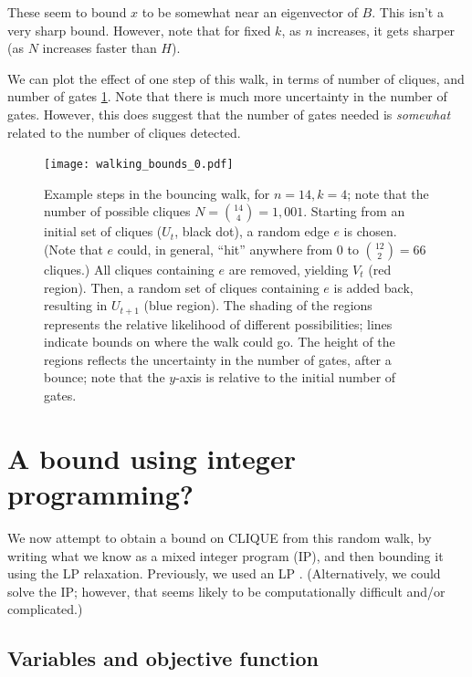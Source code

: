 \documentclass[12pt]{article}
\theoremstyle{definition}
\begin{document}
These seem to bound $x$ to be somewhat near an eigenvector of $B$. This isn't a very sharp bound.
However, note that for fixed $k$, as $n$ increases, it gets sharper (as $N$ increases faster than $H$).

We can plot the effect of one step of this walk, in terms of number of cliques, and number of gates \ref{fig:walk}.
Note that there is much more uncertainty in the number of gates. However, this does suggest that the
number of gates needed is {\em somewhat} related to the number of cliques detected.

\begin{figure}

\centering

\texttt{[image: walking\_bounds\_0.pdf]}

\caption{
Example steps in the bouncing walk, for $n=14, k=4$; 
note that the number of possible cliques $N = {14 \choose 4} = 1,001$.
 Starting from an initial set of cliques ($U_t$, black dot),
a random edge $e$ is chosen. (Note that $e$ could, in general,
``hit'' anywhere from 0 to ${12 \choose 2} = 66$ cliques.)
 All cliques containing $e$ are removed, yielding $V_t$ (red region).
Then, a random set of cliques containing $e$ is added back, resulting in $U_{t+1}$ (blue region).
The shading of the regions represents the relative likelihood of different possibilities;
lines indicate bounds on where the walk could go.
The height of the regions reflects the uncertainty in the number
of gates, after a bounce; note that the $y$-axis is relative to the initial number of gates.
}
\label{fig:walk}

\end{figure}


\section{A bound using integer programming?}

We now attempt to obtain a bound on CLIQUE from this random walk, by
writing what we know as a mixed integer program (IP), and then bounding it
using the LP relaxation. Previously, we used an LP \cite{buggyclique}.
(Alternatively, we could solve the IP; however, that seems likely to
be computationally difficult and/or complicated.)

\subsection{Variables and objective function}
\end{document}
